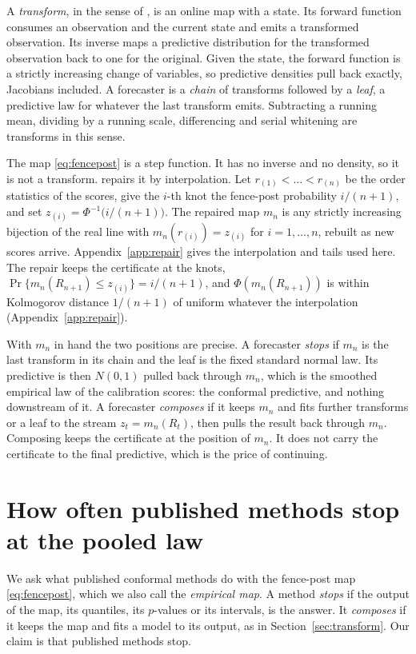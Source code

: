 \documentclass[11pt]{article}
\theoremstyle{remark}
\begin{document}
A \emph{transform}, in the sense of \citet{cotton2026transforms}, is an online map
with a state. Its forward function consumes an observation and the current state
and emits a transformed observation. Its inverse maps a predictive distribution for
the transformed observation back to one for the original. Given the state, the
forward function is a strictly increasing change of variables, so predictive
densities pull back exactly, Jacobians included. A forecaster is a \emph{chain} of
transforms followed by a \emph{leaf}, a predictive law for whatever the last
transform emits. Subtracting a running mean, dividing by a running scale,
differencing and serial whitening are transforms in this sense.

The map \eqref{eq:fencepost} is a step function. It has no inverse and no density,
so it is not a transform. \citet{cotton2026grammar} repairs it by interpolation. Let
$r_{(1)}<\dots<r_{(n)}$ be the order statistics of the scores, give the $i$-th knot
the fence-post probability $i/(n+1)$, and set $z_{(i)}=\Phi^{-1}\big(i/(n+1)\big)$.
The repaired map $m_n$ is any strictly increasing bijection of the real line with
$m_n(r_{(i)})=z_{(i)}$ for $i=1,\dots,n$, rebuilt as new scores arrive.
Appendix~\ref{app:repair} gives the interpolation and tails used here. The repair
keeps the certificate at the knots, $\Pr\{m_n(R_{n+1})\le z_{(i)}\}=i/(n+1)$, and
$\Phi(m_n(R_{n+1}))$ is within Kolmogorov distance $1/(n+1)$ of uniform whatever the
interpolation (Appendix~\ref{app:repair}).

With $m_n$ in hand the two positions are precise. A forecaster \emph{stops} if $m_n$
is the last transform in its chain and the leaf is the fixed standard normal law.
Its predictive is then $N(0,1)$ pulled back through $m_n$, which is the smoothed
empirical law of the calibration scores: the conformal predictive, and nothing
downstream of it. A forecaster \emph{composes} if it keeps $m_n$ and fits further
transforms or a leaf to the stream $z_t=m_n(R_t)$, then pulls the result back
through $m_n$. Composing keeps the certificate at the position of $m_n$. It does not
carry the certificate to the final predictive, which is the price of continuing.

\section{How often published methods stop at the pooled law}\label{sec:count}

We ask what published conformal methods do with the fence-post map
\eqref{eq:fencepost}, which we also call the \emph{empirical map}. A method
\emph{stops} if the output of the map, its quantiles, its $p$-values or its
intervals, is the answer. It \emph{composes} if it keeps the map and fits a model to
its output, as in Section~\ref{sec:transform}. Our claim is that published methods
stop.
\end{document}
